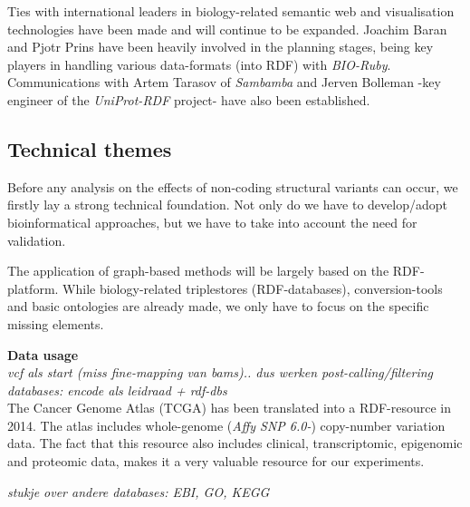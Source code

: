 \documentclass[twoside,fontsize=12pt]{article}
\begin{document}
Ties with international leaders in biology-related semantic web and visualisation technologies have been made and will continue to be expanded. Joachim Baran and Pjotr Prins have been heavily involved in the planning stages, being key players in handling various data-formats (into RDF) with \textit{BIO-Ruby}. Communications with Artem Tarasov of \textit{Sambamba} and Jerven Bolleman -key engineer of the \textit{UniProt-RDF} project- have also been established.
%	
%
%
%



\subsection*{Technical themes}
Before any analysis on the effects of non-coding structural variants can occur, we firstly lay a strong technical foundation. Not only do we have to develop/adopt bioinformatical approaches, but we have to take into account the need for validation.

The application of graph-based methods will be largely based on the RDF-platform. While biology-related triplestores (RDF-databases), conversion-tools and basic ontologies are already made, we only have to focus on the specific missing elements.
\medskip

\noindent
\textbf{Data usage} \\

\emph{ \color{red}vcf als start (miss fine-mapping van bams).. dus werken post-calling/filtering
databases: encode als leidraad + rdf-dbs}\\

The Cancer Genome Atlas (TCGA) has been translated into a RDF-resource in 2014\cite{Saleem2014}. The atlas includes whole-genome (\emph{Affy SNP 6.0-}) copy-number variation data. The fact that this resource also includes clinical, transcriptomic, epigenomic and proteomic data, makes it a very valuable resource for our experiments.

\emph{ \color{red}stukje over andere databases: EBI, GO, KEGG}
\end{document}
